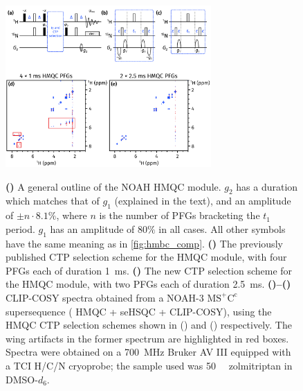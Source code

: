 \documentclass[a4paper,11pt]{article}
\newcommand{\carbon}{\ch{^{13}C}}
\newcommand{\nitrogen}{\ch{^{15}N}}
\newcommand*{\zolmi}{Spectra were obtained on a \SI{700}{\MHz} Bruker AV III equipped with a TCI H/C/N cryoprobe; the sample used was \SI{50}{\milli\molar} zolmitriptan in DMSO-\(d_6\).}
\begin{document}
\begin{refsection}
\begin{figure}[ht]
    \centering
    \includegraphics[width=0.7\textwidth]{hmqc_comp.png}
    {\label{fig:hmqc_comp_pulprog}}
    {\label{fig:hmqc_comp_pulprog_before}}
    {\label{fig:hmqc_comp_pulprog_after}}
    {\label{fig:hmqc_comp_spec_before}}
    {\label{fig:hmqc_comp_spec_after}}
    \caption{
        \textbf{()} A general outline of the NOAH \nitrogen{} HMQC module.
        \(g_2\) has a duration which matches that of \(g_1\) (explained in the text), and an amplitude of \(\pm n \cdot 8.1\%\), where \(n\) is the number of PFGs bracketing the \(t_1\) period.
        \(g_1\) has an amplitude of \(80\%\) in all cases.
        All other symbols have the same meaning as in \cref{fig:hmbc_comp}.
        \textbf{()} The previously published CTP selection scheme for the HMQC module, with four PFGs each of duration \SI{1}{ms}.
        \textbf{()} The new CTP selection scheme for the HMQC module, with two PFGs each of duration \SI{2.5}{ms}.
        \textbf{()--()} CLIP-COSY spectra obtained from a NOAH-3 \(\mathrm{MS^+C^c}\) supersequence (\nitrogen{} HMQC + \carbon{} seHSQC + CLIP-COSY), using the HMQC CTP selection schemes shown in () and () respectively.
        The wing artifacts in the former spectrum are highlighted in red boxes.
        \zolmi{}
    }
    \label{fig:hmqc_comp}
\end{figure}


\end{refsection}
\end{document}
